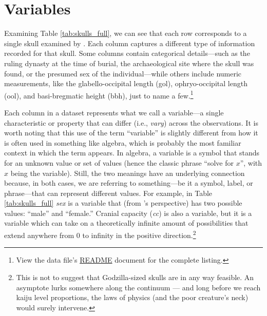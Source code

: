 \section{Variables}

Examining Table \ref{tab:skulls_full}, we can see that each row corresponds to a single skull examined by \textcite{Thomson1905}. Each column captures a different type of information recorded for that skull. Some columns contain categorical details—such as the ruling dynasty at the time of burial, the archaeological site where the skull was found, or the presumed sex of the individual—while others include numeric measurements, like the glabello-occipital length (gol), ophryo-occipital length (ool), and basi-bregmatic height (bbh), just to name a few.\footnote{View the data file's \href{https://github.com/statistical-grimoire/book/blob/main/data/Egyptian-skulls/README.md}{README} document for the complete listing.}

Each column in a dataset represents what we call a \gls{variable}—a single characteristic or property that can differ (i.e., \textit{vary}) across the observations. It is worth noting that this use of the term ``variable'' is slightly different from how it is often used in something like algebra, which is probably the most familiar context in which the term appears. In algebra, a variable is a symbol that stands for an unknown value or set of values (hence the classic phrase ``solve for $x$'', with $x$ being the variable). Still, the two meanings have an underlying connection because, in both cases, we are referring to something—be it a symbol, label, or phrase—that can represent different values. For example, in Table \ref{tab:skulls_full} \textit{sex} is a variable that (from \citeauthor{Thomson1905}'s perspective) has two possible values: ``male'' and ``female.''  Cranial capacity (\textit{cc}) is also a variable, but it is a variable which can take on a theoretically infinite amount of possibilities that extend anywhere from 0 to infinity in the positive direction.\footnote{This is not to suggest that Godzilla-sized skulls are in any way feasible. An asymptote lurks somewhere along the continuum — and long before we reach kaiju level proportions, the laws of physics (and the poor creature’s neck) would surely intervene.}

